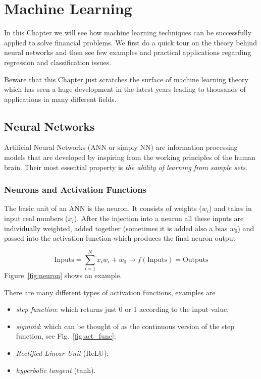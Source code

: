 \chapter{Machine Learning}
\label{ch:neural-network}

In this Chapter we will see how machine learning techniques can be successfully applied to solve financial problems. We first do a quick tour on the theory behind neural networks and then see few examples and practical applications regarding regression and classification issues.

Beware that this Chapter just scratches the surface of machine learning theory which has seen a huge development in the latest years leading to thousands of applications in many different fields.
    
\section{Neural Networks}\label{neural-networks}

Artificial Neural Networks (ANN or simply NN) are information processing models that are developed by inspiring from the working principles of the human brain. Their most essential property is \emph{the ability of learning from sample sets}.

\subsection{Neurons and Activation Functions}
The basic unit of an ANN is the neuron.
It consists of weights (\(w_i\)) and takes in input real numbers (\(x_i\)). After the injection into a neuron all these inputs are individually weighted, added together (sometimes it is added also a bias \(w_0\)) and passed into the activation function which produces the final neuron output

\[ \textrm{Inputs} = \sum_{i=1}^{N} x_i w_i + w_0 \rightarrow f(\textrm{Inputs}) = \textrm{Outputs}\]
Figure~\ref{fig:neuron} shows an example.

There are many different types of activation functions, examples are
\begin{itemize}
\item \emph{step function}: which returns just 0 or 1 according to the input value;
\item \emph{sigmoid}: which can be thought of as the continuous version of the step function, see Fig.~\ref{fig:act_func};
\item \emph{Rectified Linear Unit} (ReLU);
\item \emph{hyperbolic tangent} (tanh).
\end{itemize}

